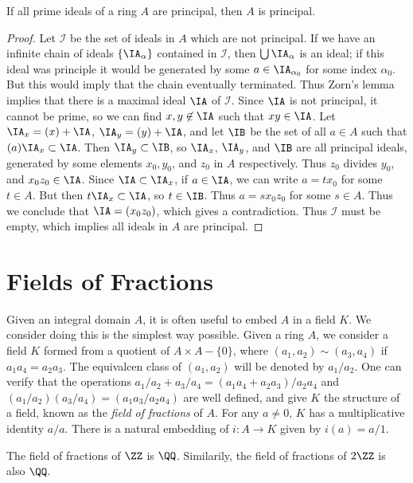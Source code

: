 \begin{theorem}
    If all prime ideals of a ring $A$ are principal, then $A$ is principal.
\end{theorem}
\begin{proof}
    Let $\mathcal{I}$ be the set of ideals in $A$ which are not principal. If we have an infinite chain of ideals $\{ \IA_\alpha \}$ contained in $\mathcal{I}$, then $\bigcup \IA_\alpha$ is an ideal; if this ideal was principle it would be generated by some $a \in \IA_{\alpha_0}$ for some index $\alpha_0$. But this would imply that the chain eventually terminated. Thus Zorn's lemma implies that there is a maximal ideal $\IA$ of $\mathcal{I}$. Since $\IA$ is not principal, it cannot be prime, so we can find $x,y \not \in \IA$ such that $xy \in \IA$. Let $\IA_x = (x) + \IA$, $\IA_y = (y) + \IA$, and let $\IB$ be the set of all $a \in A$ such that $(a) \IA_x \subset \IA$. Then $\IA_y \subset \IB$, so $\IA_x$, $\IA_y$, and $\IB$ are all principal ideals, generated by some elements $x_0,y_0$, and $z_0$ in $A$ respectively. Thus $z_0$ divides $y_0$, and $x_0z_0 \in \IA$. Since $\IA \subset \IA_x$, if $a \in \IA$, we can write $a = tx_0$ for some $t \in A$. But then $t\IA_x \subset \IA$, so $t \in \IB$. Thus $a = sx_0z_0$ for some $s \in A$. Thus we conclude that $\IA = (x_0z_0)$, which gives a contradiction. Thus $\mathcal{I}$ must be empty, which implies all ideals in $A$ are principal.
\end{proof}

\section{Fields of Fractions}

Given an integral domain $A$, it is often useful to embed $A$ in a field $K$. We consider doing this is the simplest way possible. Given a ring $A$, we consider a field $K$ formed from a quotient of $A \times A - \{ 0 \}$, where $(a_1,a_2) \sim (a_3,a_4)$ if $a_1a_4 = a_2a_3$. The equivalcen class of $(a_1,a_2)$ will be denoted by $a_1/a_2$. One can verify that the operations $a_1/a_2 + a_3/a_4 = (a_1a_4 + a_2a_3)/a_2a_4$ and $(a_1/a_2)(a_3/a_4) = (a_1a_3/a_2a_4)$ are well defined, and give $K$ the structure of a field, known as the \emph{field of fractions} of $A$. For any $a \neq 0$, $K$ has a multiplicative identity $a/a$. There is a natural embedding of $i: A \to K$ given by $i(a) = a/1$.

\begin{example}
    The field of fractions of $\ZZ$ is $\QQ$. Similarily, the field of fractions of $2\ZZ$ is also $\QQ$.
\end{example}


